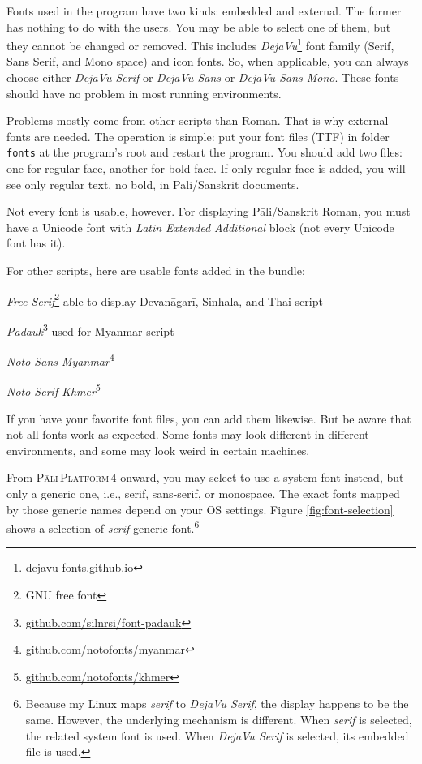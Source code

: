 Fonts used in the program have two kinds: embedded and external. The former has nothing to do with the users. You may be able to select one of them, but they cannot be changed or removed. This includes \emph{DejaVu}\footnote{\url{dejavu-fonts.github.io}} font family (Serif, Sans Serif, and Mono space) and icon fonts. So, when applicable, you can always choose either \emph{DejaVu Serif} or \emph{DejaVu Sans} or \emph{DejaVu Sans Mono}. These fonts should have no problem in most running environments.

Problems mostly come from other scripts than Roman. That is why external fonts are needed. The operation is simple: put your font files (TTF) in folder \texttt{fonts} at the program's root and restart the program. You should add two files: one for regular face, another for bold face. If only regular face is added, you will see only regular text, no bold, in Pāli/Sanskrit documents.

Not every font is usable, however. For displaying Pāli/Sanskrit Roman, you must have a Unicode font with \emph{Latin Extended Additional} block (not every Unicode font has it).

For other scripts, here are usable fonts added in the bundle:

\begin{compactitem}
\item \emph{Free Serif}\footnote{GNU free font} able to display Devanāgarī, Sinhala, and Thai script
\item \emph{Padauk}\footnote{\url{github.com/silnrsi/font-padauk}} used for Myanmar script
\item \emph{Noto Sans Myanmar}\footnote{\url{github.com/notofonts/myanmar}}
\item \emph{Noto Serif Khmer}\footnote{\url{github.com/notofonts/khmer}}
\end{compactitem}

If you have your favorite font files, you can add them likewise. But be aware that not all fonts work as expected. Some fonts may look different in different environments, and some may look weird in certain machines.

From \textsc{Pāli\,Platform\,4} onward, you may select to use a system font instead, but only a generic one, i.e., serif, sans-serif, or monospace. The exact fonts mapped by those generic names depend on your OS settings. Figure \ref{fig:font-selection} shows a selection of \emph{serif} generic font.\footnote{Because my Linux maps \emph{serif} to \emph{DejaVu Serif}, the display happens to be the same. However, the underlying mechanism is different. When \emph{serif} is selected, the related system font is used. When \emph{DejaVu Serif} is selected, its embedded file is used.}

